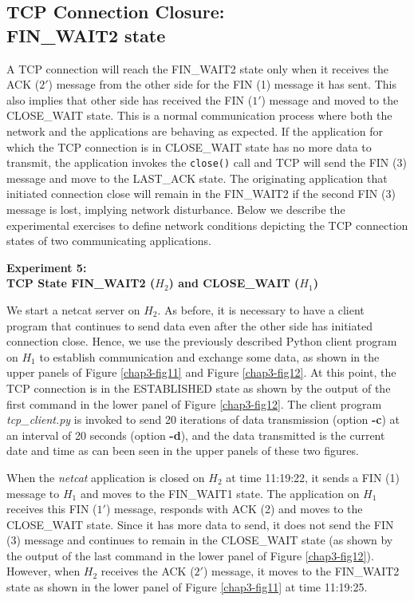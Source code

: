 \begin{multicols}{2}
\section{TCP Connection Closure:\\ FIN\_WAIT2 state}


A TCP connection will reach the FIN\_WAIT2 state only when it receives the ACK ($2'$) message from the other side for the FIN (1) message it has sent. This also implies that other side has received the FIN ($1'$) message and moved to the CLOSE\_WAIT state. This is a normal communication process where both the network and the applications are behaving as expected. If the application for which the TCP 
connection is in CLOSE\_WAIT state has no more data to transmit, the application invokes the \lstinline|close()| call and TCP will send the FIN (3) message and move to the LAST\_ACK state. The originating application that initiated connection close will remain in the FIN\_WAIT2 if the second FIN (3) message is lost, implying network disturbance. Below we describe the experimental exercises to define network conditions depicting the TCP connection states of two communicating applications.
\smallskip

\noindent
\textbf{Experiment 5:\\ TCP State FIN\_WAIT2 (\boldmath$H_{2}$) and CLOSE\_WAIT ($H_{1}$)}


We start a netcat server on $H_{2}$. As before, it is necessary to have a client program that continues to send data even after the other side has initiated connection close. Hence, we use the previously described Python client program on $H_{1}$ to establish communication and exchange some data, as shown in the upper panels of Figure \ref{chap3-fig11} and Figure \ref{chap3-fig12}. At this point, the TCP connection is in the ESTABLISHED state as shown by the output of the first command in the lower panel of Figure \ref{chap3-fig12}. The client program \textit{tcp\_client.py} is invoked to send 20 iterations of data transmission (option \textbf{-c}) at an interval of 20 seconds (option \textbf{-d}), and the data transmitted is the current date and time as can been seen in the upper panels of these two figures.

When the \textit{netcat} application is closed on $H_{2}$ at time 11:19:22, it sends a FIN (1) message to $H_{1}$ and moves to the FIN\_WAIT1 state. The application on $H_{1}$ receives this FIN ($1'$) message, responds with ACK (2) and moves to the CLOSE\_WAIT state. Since it has more data to send, it does not send the FIN (3) message and continues to remain in the CLOSE\_WAIT state (as shown by the output of the last command in the lower panel of Figure \ref{chap3-fig12}). However, when $H_{2}$ receives the ACK ($2'$) message, it moves to the FIN\_WAIT2 state as shown in the lower panel of Figure \ref{chap3-fig11} at time 11:19:25.


\end{multicols}
